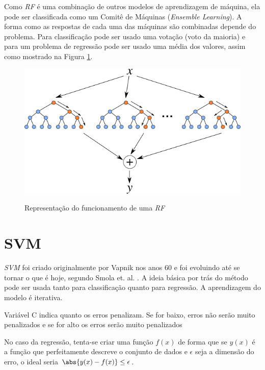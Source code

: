 Como \textit{\acrshort{RF}} é uma combinação de outros modelos de aprendizagem de máquina, ela pode ser classificada como um Comitê de Máquinas (\textit{Ensemble Learning}). A forma como as respostas de cada uma das máquinas são combinadas depende do problema. Para classificação pode ser usado uma votação (voto da maioria) e para um problema de regressão pode ser usado uma média dos valores, assim como mostrado na Figura \ref{figure:random_forest}.

\begin{figure}[htbp]
    \centering
    \includegraphics[scale=1.0]{monography/img/random_forest.png}
    \label{figure:random_forest}
    \caption[Representação do funcionamento de uma \textit{\acrshort{RF}}]{Representação do funcionamento de uma \textit{\acrshort{RF}}\footnotemark}
\end{figure}


\section{\acrfull{SVM}}

\textit{\acrshort{SVM}} foi criado originalmente por Vapnik nos anos 60 e foi evoluindo até se tornar o que é hoje, segundo Smola et. al. \cite{Smola03atutorial}. A ideia básica por trás do método pode ser usada tanto para classificação quanto para regressão. A aprendizagem do modelo é iterativa.

Variável C indica quanto os erros penalizam. Se for baixo, erros não serão muito penalizados e se for alto os erros serão muito penalizados

No caso da regressão, tenta-se criar uma função \(f(x)\) de forma que se \(y(x)\) é a função que perfeitamente descreve o conjunto de dados e \(\epsilon\) seja a dimensão do erro, o ideal seria \(\abs{y(x) - f(x)} \leq \epsilon \).

